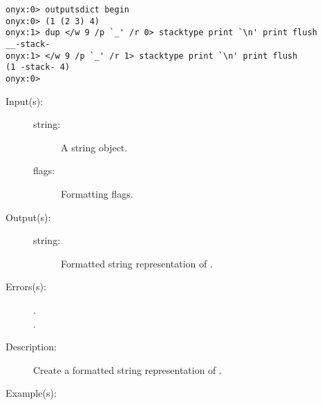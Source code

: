 \begin{description}
\begin{description}
\begin{verbatim}
onyx:0> outputsdict begin
onyx:0> (1 (2 3) 4)
onyx:1> dup </w 9 /p `_' /r 0> stacktype print `\n' print flush
__-stack-
onyx:1> </w 9 /p `_' /r 1> stacktype print `\n' print flush
(1 -stack- 4)
onyx:0>
		\end{verbatim}
	\end{description}
\label{outputsdict:stringtype}
\item[{\onyxop{string flags}{stringtype}{string}}: ]
	\begin{description}\item[]
	\item[Input(s): ]
		\begin{description}\item[]
		\item[string: ]
			A string object.
		\item[flags: ]
			Formatting flags.
		\end{description}
	\item[Output(s): ]
		\begin{description}\item[]
		\item[string: ]
			Formatted string representation of .
		\end{description}
	\item[Errors(s): ]
		\begin{description}\item[]
		\item[.]
		\item[.]
		\end{description}
	\item[Description: ]
		Create a formatted string representation of .
	\item[Example(s): ]\begin{verbatim}


\end{verbatim}
\end{description}
\end{description}
